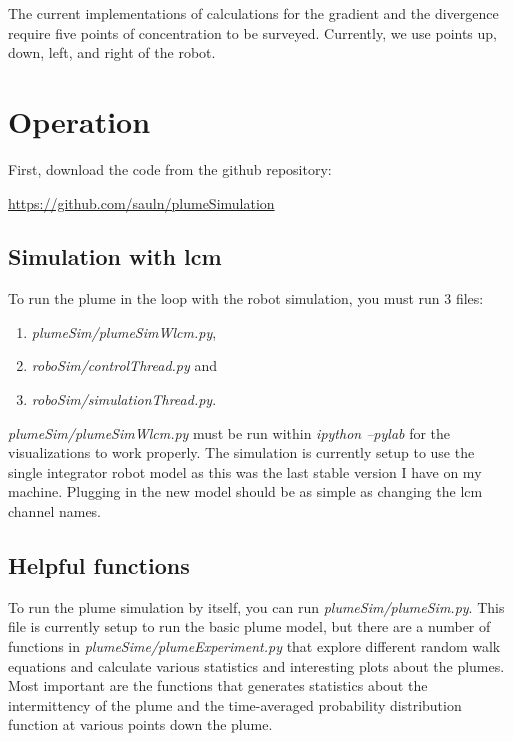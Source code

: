 \documentclass[11pt]{article} %
\begin{document}
The current implementations of calculations for the gradient and the divergence require five points of concentration to be surveyed.  Currently, we use points up, down, left, and right of the robot.  




\section{Operation}
First, download the code from the github repository: 
	\begin{center} \url{https://github.com/sauln/plumeSimulation  } \end{center}

\subsection{Simulation with lcm}

To run the plume in the loop with the robot simulation, you must run 3 files:
	\begin{enumerate}
	\item {\it plumeSim/plumeSimWlcm.py}, 
	\item {\it roboSim/controlThread.py} and 
	\item{\it roboSim/simulationThread.py}.
	\end{enumerate}

{\it  plumeSim/plumeSimWlcm.py} must be run within \emph{ipython --pylab} for the visualizations to work properly.  The simulation is currently setup to use the single integrator robot model as this was the last stable version I have on my machine.  Plugging in the new model should be as simple as changing the lcm channel names.

\subsection{Helpful functions}
To run the plume simulation by itself, you can run {\it plumeSim/plumeSim.py}.  This file is currently setup to run the basic plume model, but there are a number of functions in {\it plumeSime/plumeExperiment.py} that explore different random walk equations and calculate various statistics and interesting plots about the plumes. Most important are the functions that generates statistics about the intermittency of the plume and the time-averaged probability distribution function at various points down the plume.  
\end{document}
